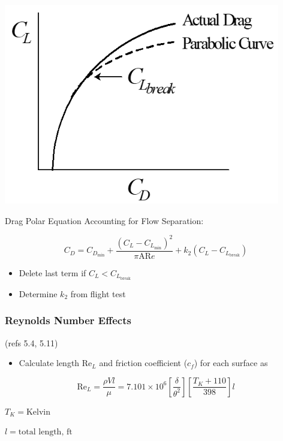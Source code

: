 \documentclass[
]{book}
\providecommand{\tightlist}{%
  \setlength{\itemsep}{0pt}\setlength{\parskip}{0pt}}
\begin{document}
\includegraphics[width=4.75in,height=3.46in]{media/05/image76.png}

Drag Polar Equation Accounting for Flow Separation:

\[C_D = C_{D_{\mathrm{min}}} + \frac{\left(C_L - C_{L_{\mathrm{min}}}\right)^2}{\pi \mathrm{AR} e} +k_2\left(C_L - C_{L_{\mathrm{break}}}\right)\]

\begin{itemize}
\tightlist
\item
  Delete last term if \(C_L < C_{L_{\mathrm{break}}}\)
\item
  Determine \(k_2\) from flight test
\end{itemize}

\hypertarget{reynolds-number-effects-1}{%
\subsubsection*{Reynolds Number Effects}\label{reynolds-number-effects-1}}

(refs 5.4, 5.11)

\begin{itemize}
\tightlist
\item
  Calculate length \(\mathrm{Re}_L\) and friction coefficient (\(c_f\)) for each surface as
\end{itemize}

\[\mathrm{Re}_L = \frac{\rho Vl}{\mu} = 7.101 \times10^6 \left[\frac{\delta}{\theta^2} \right]\left[\frac{T_K + 110}{398}\right] l \]

\(T_K = \text{Kelvin}\)

\(l = \text{total length, ft}\)
\end{document}
